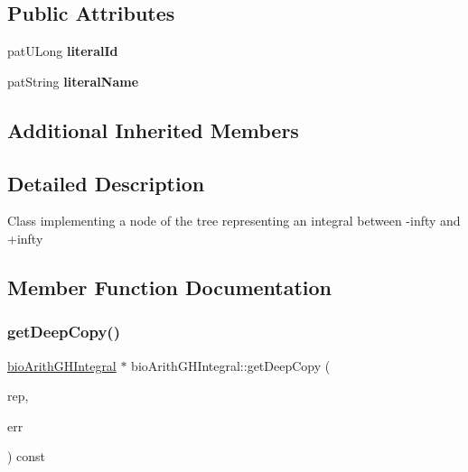 \subsection*{Public Attributes}
\begin{DoxyCompactItemize}
\item 
\mbox{\label{classbio_arith_g_h_integral_a0f454f8bb154996248767e5d91ffcfe0}} 
pat\+U\+Long {\bfseries literal\+Id}
\item 
\mbox{\label{classbio_arith_g_h_integral_abd269a8e70436ad0c429c8b910cbd877}} 
pat\+String {\bfseries literal\+Name}
\end{DoxyCompactItemize}
\subsection*{Additional Inherited Members}


\subsection{Detailed Description}
Class implementing a node of the tree representing an integral between -\/infty and +infty 

\subsection{Member Function Documentation}
\mbox{\label{classbio_arith_g_h_integral_a4864f99351baa9b168451d2356d2e7bf}} 
\subsubsection{\texorpdfstring{get\+Deep\+Copy()}{getDeepCopy()}}
{\footnotesize\ttfamily \hyperlink{classbio_arith_g_h_integral}{bio\+Arith\+G\+H\+Integral} $\ast$ bio\+Arith\+G\+H\+Integral\+::get\+Deep\+Copy (\begin{DoxyParamCaption}\item[{\hyperlink{classbio_expression_repository}{bio\+Expression\+Repository} $\ast$}]{rep,  }\item[{pat\+Error $\ast$\&}]{err }\end{DoxyParamCaption}) const\hspace{0.3cm}{\ttfamily [virtual]}}

